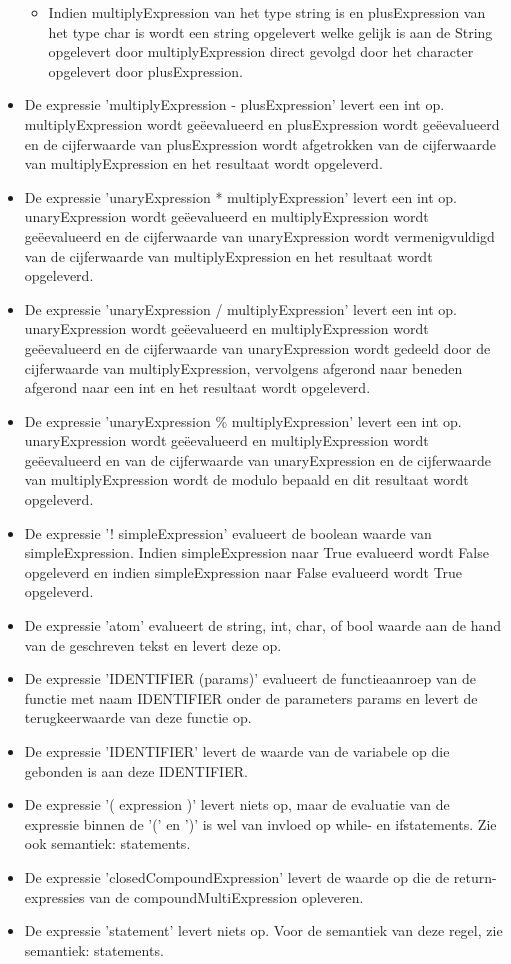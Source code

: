\begin{itemize}
\begin{itemize}
            \item Indien multiplyExpression van het type string is en plusExpression van het type char is wordt een string opgelevert welke gelijk is aan de String opgelevert door multiplyExpression direct gevolgd door het character opgelevert door plusExpression.
            \end{itemize}
        \item De expressie 'multiplyExpression - plusExpression' levert een int op. multiplyExpression wordt ge\"{e}evalueerd en plusExpression wordt ge\"{e}evalueerd en de cijferwaarde van plusExpression wordt afgetrokken van de cijferwaarde van multiplyExpression en het resultaat wordt opgeleverd.
        \item De expressie 'unaryExpression * multiplyExpression' levert een int op. unaryExpression wordt ge\"{e}evalueerd en multiplyExpression wordt ge\"{e}evalueerd en de cijferwaarde van unaryExpression wordt vermenigvuldigd van de cijferwaarde van multiplyExpression en het resultaat wordt opgeleverd.
        \item De expressie 'unaryExpression / multiplyExpression' levert een int op. unaryExpression wordt ge\"{e}evalueerd en multiplyExpression wordt ge\"{e}evalueerd en de cijferwaarde van unaryExpression wordt gedeeld door de cijferwaarde van multiplyExpression, vervolgens afgerond naar beneden afgerond naar een int en het resultaat wordt opgeleverd.
        \item De expressie 'unaryExpression \% multiplyExpression' levert een int op. unaryExpression wordt ge\"{e}evalueerd en multiplyExpression wordt ge\"{e}evalueerd en van de cijferwaarde van unaryExpression en de cijferwaarde van multiplyExpression wordt de modulo bepaald en dit resultaat wordt opgeleverd.
        \item De expressie '! simpleExpression' evalueert de boolean waarde van simpleExpression. Indien simpleExpression naar True evalueerd wordt False opgeleverd en indien simpleExpression naar False evalueerd wordt True opgeleverd.
        \item De expressie 'atom' evalueert de string, int, char, of bool waarde aan de hand van de geschreven tekst en levert deze op.
        \item De expressie 'IDENTIFIER (params)' evalueert de functieaanroep van de functie met naam IDENTIFIER onder de parameters params en levert de terugkeerwaarde van deze functie op.
        \item De expressie 'IDENTIFIER' levert de waarde van de variabele op die gebonden is aan deze IDENTIFIER.
        \item De expressie '( expression )' levert niets op, maar de evaluatie van de expressie binnen de '(' en ')' is wel van invloed op while- en ifstatements. Zie ook semantiek: statements.
        \item De expressie 'closedCompoundExpression' levert de waarde op die de return-expressies van de compoundMultiExpression opleveren.
        \item De expressie 'statement' levert niets op. Voor de semantiek van deze regel, zie semantiek: statements. 
        \end{itemize}

